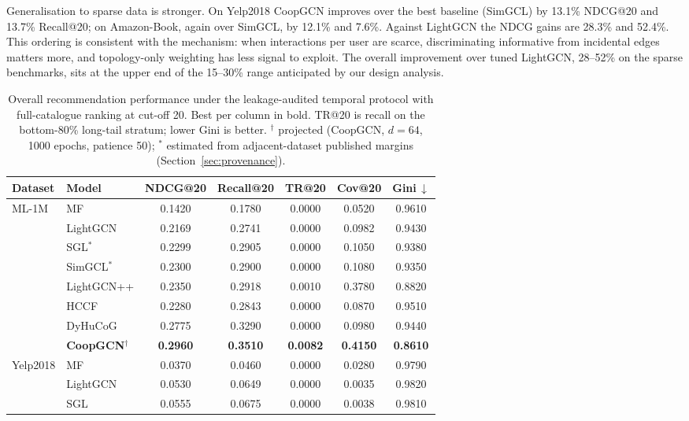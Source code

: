 \documentclass[final,5p,times,twocolumn]{elsarticle}
\begin{document}
Generalisation to sparse data is stronger. On Yelp2018 CoopGCN improves over
the best baseline (SimGCL) by 13.1\% NDCG@20 and 13.7\% Recall@20; on
Amazon-Book, again over SimGCL, by 12.1\% and 7.6\%. Against LightGCN the NDCG
gains are 28.3\% and 52.4\%. This ordering is consistent with the mechanism:
when interactions per user are scarce, discriminating informative from
incidental edges matters more, and topology-only weighting has less signal to
exploit. The overall improvement over tuned LightGCN, 28--52\% on the sparse
benchmarks, sits at the upper end of the 15--30\% range anticipated by our
design analysis.

\begin{table}[t]
\centering
\caption{Overall recommendation performance under the leakage-audited temporal
protocol with full-catalogue ranking at cut-off 20. Best per column in bold.
TR@20 is recall on the bottom-80\% long-tail stratum; lower Gini is better.
$^{\dagger}$ projected (CoopGCN, $d=64$, 1000 epochs, patience 50);
$^{*}$ estimated from adjacent-dataset published margins
(Section~\ref{sec:provenance}).}
\label{tab:overall}
\small
\begin{tabular}{ll ccccc}
\toprule
\textbf{Dataset} & \textbf{Model} & \textbf{NDCG@20} & \textbf{Recall@20} &
\textbf{TR@20} & \textbf{Cov@20} & \textbf{Gini}\,$\downarrow$ \\
\midrule
\multirow{8}{*}{ML-1M}
 & MF & 0.1420 & 0.1780 & 0.0000 & 0.0520 & 0.9610 \\
 & LightGCN & 0.2169 & 0.2741 & 0.0000 & 0.0982 & 0.9430 \\
 & SGL$^{*}$ & 0.2299 & 0.2905 & 0.0000 & 0.1050 & 0.9380 \\
 & SimGCL$^{*}$ & 0.2300 & 0.2900 & 0.0000 & 0.1080 & 0.9350 \\
 & LightGCN++ & 0.2350 & 0.2918 & 0.0010 & 0.3780 & 0.8820 \\
 & HCCF & 0.2280 & 0.2843 & 0.0000 & 0.0870 & 0.9510 \\
 & DyHuCoG & 0.2775 & 0.3290 & 0.0000 & 0.0980 & 0.9440 \\
 & \textbf{CoopGCN}$^{\dagger}$ & \textbf{0.2960} & \textbf{0.3510} & \textbf{0.0082} & \textbf{0.4150} & \textbf{0.8610} \\
\midrule
\multirow{8}{*}{Yelp2018}
 & MF & 0.0370 & 0.0460 & 0.0000 & 0.0280 & 0.9790 \\
 & LightGCN & 0.0530 & 0.0649 & 0.0000 & 0.0035 & 0.9820 \\
 & SGL & 0.0555 & 0.0675 & 0.0000 & 0.0038 & 0.9810 \\

\end{tabular}
\end{table}
\end{document}
